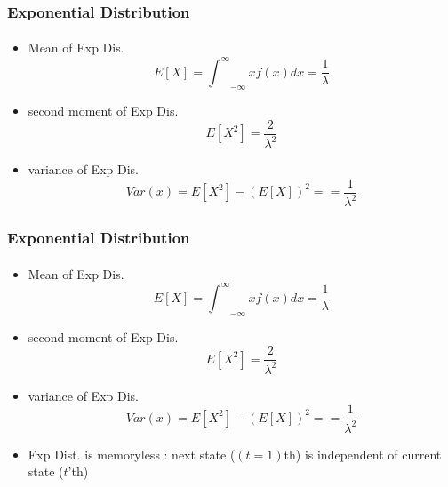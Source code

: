 \documentclass{beamer}
\begin{document}
\begin{frame} 
\frametitle{ Exponential Distribution}
\framesubtitle{\textbf{\textit{}}}
\begin{itemize}

\item Mean of Exp Dis. 
$$E[X] = {{\int}^{\infty}}_{-\infty} xf(x)dx = \frac{1}{\lambda}$$

\item second moment  of Exp Dis. 
$$E[X^2] = \frac{2}{{\lambda}^2}$$


\item variance of Exp Dis. 
$$Var(x) = E[X^2] - (E[X])^2 = = \frac{1}{{\lambda}^2}$$
\end{itemize}
	
\end{frame}




\begin{frame} 
\frametitle{ Exponential Distribution}
\framesubtitle{\textbf{\textit{}}}
\begin{itemize}

\item Mean of Exp Dis. 
$$E[X] = {{\int}^{\infty}}_{-\infty} xf(x)dx = \frac{1}{\lambda}$$

\item second moment  of Exp Dis. 
$$E[X^2] = \frac{2}{{\lambda}^2}$$


\item variance of Exp Dis. 
$$Var(x) = E[X^2] - (E[X])^2 = = \frac{1}{{\lambda}^2}$$

\item Exp Dist. is memoryless : next state ($(t=1)$th) is independent of current state ($t$'th)
\end{itemize}


	
\end{frame}


   
\end{document}
